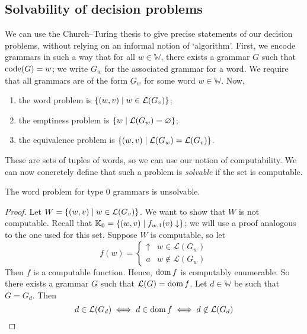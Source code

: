 \subsection{Solvability of decision problems}
We can use the Church--Turing thesis to give precise statements of our decision problems, without relying on an informal notion of `algorithm'.
First, we encode grammars in such a way that for all \( w \in \mathbb W \), there exists a grammar \( G \) such that \( \operatorname{code}(G) = w \); we write \( G_w \) for the associated grammar for a word.
We require that all grammars are of the form \( G_w \) for some word \( w \in \mathbb W \).
Now,
\begin{enumerate}
	\item the word problem is \( \qty{(w, v) \mid w \in \mathcal L(G_v)} \);
	\item the emptiness problem is \( \qty{w \mid \mathcal L(G_w) = \varnothing} \);
	\item the equivalence problem is \( \qty{(w, v) \mid \mathcal L(G_w) = \mathcal L(G_v)} \).
\end{enumerate}
These are sets of tuples of words, so we can use our notion of computability.
We can now concretely define that such a problem is \emph{solvable} if the set is computable.
\begin{theorem}
	The word problem for type 0 grammars is unsolvable.
\end{theorem}
\begin{proof}
	Let \( W = \qty{(w, v) \mid w \in \mathcal L(G_v)} \).
	We want to show that \( W \) is not computable.
	Recall that \( \mathbb K_0 = \qty{(w, v) \mid f_{w,1}(v) \downarrow} \); we will use a proof analogous to the one used for this set.
	Suppose \( W \) is computable, so let
	\[ f(w) = \begin{cases}
		\uparrow & w \in \mathcal L(G_w) \\
		a & w \not\in \mathcal L(G_w)
	\end{cases} \]
	Then \( f \) is a computable function.
	Hence, \( \operatorname{dom} f \) is computably enumerable.
	So there exists a grammar \( G \) such that \( \mathcal L(G) = \operatorname{dom} f \).
	Let \( d \in \mathbb W \) be such that \( G = G_d \).
	Then
	\[ d \in \mathcal L(G_d) \iff d \in \operatorname{dom} f \iff d \not\in \mathcal L(G_d) \]
\end{proof}


